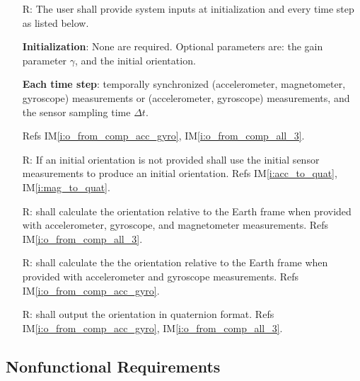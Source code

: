 \documentclass[12pt]{article}
\newcommand{\iref}[1]{IM\ref{#1}} \newcounter{reqnum} %
\begin{document}
\begin{itemize}
    \item[R\refstepcounter{reqnum}\thereqnum \label{r:inputs}:]  The user shall provide
    system inputs at initialization and every time step as listed below.

    \textbf{Initialization}: None are required. Optional parameters are: the gain parameter
    $\gamma$, and the initial orientation.

    \textbf{Each time step}: temporally synchronized (accelerometer, magnetometer, gyroscope)
    measurements or (accelerometer, gyroscope) measurements, and the sensor sampling time $\Delta
    t$.

    Refs \iref{i:o_from_comp_acc_gyro}, \iref{i:o_from_comp_all_3}.

    \item[R\refstepcounter{reqnum}\thereqnum \label{r:input2}:] If an initial orientation is not
    provided \progname{} shall use the initial sensor measurements to produce an initial
    orientation. Refs \iref{i:acc_to_quat}, \iref{i:mag_to_quat}.

    \item[R\refstepcounter{reqnum}\thereqnum \label{r:calculate1}:] \progname{} shall calculate the
    orientation relative to the Earth frame when provided with  accelerometer, gyroscope, and
    magnetometer measurements. Refs \iref{i:o_from_comp_all_3}.

    \item[R\refstepcounter{reqnum}\thereqnum \label{r:calculate2}:] \progname{} shall calculate the
    the orientation relative to the Earth frame when provided with accelerometer and gyroscope
    measurements. Refs \iref{i:o_from_comp_acc_gyro}.

    \item[R\refstepcounter{reqnum}\thereqnum \label{r:output}:] 
    \progname{} shall output the orientation in quaternion format. Refs
    \iref{i:o_from_comp_acc_gyro}, \iref{i:o_from_comp_all_3}.
\end{itemize}


\subsection{Nonfunctional Requirements}
\end{document}
